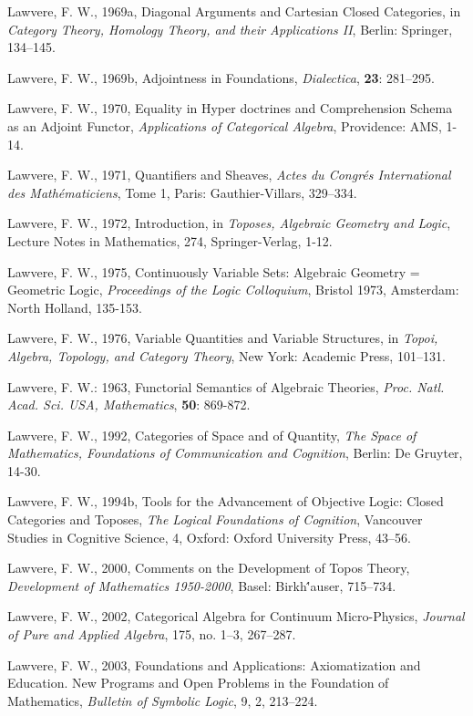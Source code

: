 \documentclass[12pt]{article}
\theoremstyle{plain}
\theoremstyle{definition}
\numberwithin{equation}{section}
\begin{document}
\begin{thebibliography}{199}
Lawvere, F. W., 1969a, Diagonal Arguments and Cartesian Closed Categories, in {\em Category Theory, Homology Theory, and their Applications II}, Berlin: Springer, 134--145.  

Lawvere, F. W., 1969b, Adjointness in Foundations, {\em Dialectica}, \textbf{23}: 281--295.  

Lawvere, F. W., 1970, Equality in Hyper doctrines and Comprehension Schema as an Adjoint Functor, 
{\em Applications of Categorical Algebra}, Providence: AMS, 1-14.  

Lawvere, F. W., 1971, Quantifiers and Sheaves, {\em Actes du Congr\'es International des Math\'ematiciens}, Tome 1, Paris: Gauthier-Villars, 329--334. 

Lawvere, F. W., 1972, Introduction, in {\em Toposes, Algebraic Geometry and Logic}, Lecture Notes in Mathematics, 274, Springer-Verlag, 1-12.  

Lawvere, F. W., 1975, Continuously Variable Sets: Algebraic Geometry = Geometric Logic, {\em Proceedings of the Logic Colloquium}, Bristol 1973, Amsterdam: North Holland, 135-153. 

Lawvere, F. W., 1976, Variable Quantities and Variable Structures, in {\em Topoi, Algebra, Topology, and Category Theory}, New York: Academic Press, 101--131. 

Lawvere, F. W.: 1963, Functorial Semantics of Algebraic Theories, \emph{Proc. Natl. Acad. Sci. USA, Mathematics}, \textbf{50}: 869-872.

Lawvere, F. W., 1992, Categories of Space and of Quantity, {\em The Space of Mathematics, Foundations of Communication and Cognition}, Berlin: De Gruyter, 14-30.  

Lawvere, F. W., 1994b, Tools for the Advancement of Objective Logic: Closed Categories and Toposes, 
{\em The Logical Foundations of Cognition}, Vancouver Studies in Cognitive Science, 4, Oxford: Oxford University Press, 43--56.  

Lawvere, F. W., 2000, Comments on the Development of Topos Theory, {\em Development of Mathematics 1950-2000}, Basel: Birkh\''auser, 715--734. 

Lawvere, F. W., 2002, Categorical Algebra for Continuum Micro-Physics, {\em Journal of Pure and Applied Algebra}, 175, no. 1--3, 267--287. 

Lawvere, F. W., 2003, Foundations and Applications: Axiomatization and Education. New Programs and Open Problems in the Foundation of Mathematics, {\em Bulletin of Symbolic Logic}, 9, 2, 213--224. 


\end{thebibliography}
\end{document}
